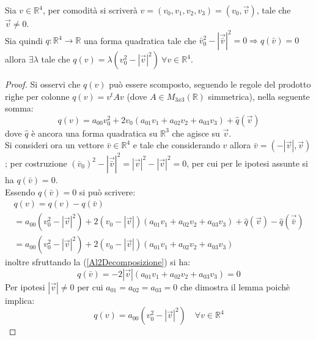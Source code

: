 \begin{lemma}
    Sia $v\in\mathbb{R}^4$, per comodità si scriverà $v=(v_0,v_1,v_2,v_3)=(v_0,\vec{v})$, tale che $\vec{v}\neq 0$.\\ Sia quindi $q:\mathbb{R}^4\rightarrow\mathbb{R}$ 
    una forma quadratica tale che $\bar{v}_0^2-|\vec{\bar{v}}|^2=0 \Rightarrow q(\bar{v})=0$ allora $\exists \lambda $ 
    tale che $ q(v)=\lambda(v_0^2-|\vec{v}|^2)\ \forall v\in\mathbb{R}^4$.
    \label{lemm:A2}
\end{lemma}
\begin{proof}
    Si osservi che $q(v)$ può essere scomposto, seguendo le regole del prodotto righe per colonne $q(v)=v^tAv$ (dove 
    $A\in M_{3x3}(\mathbb{R})$ simmetrica), nella seguente somma:
    \begin{equation*}
        q(v)=a_{00}v_0^2+2v_0(a_{01}v_1+a_{02}v_2+a_{03}v_3)+\hat{q}(\vec{v})
    \end{equation*}
    dove $\hat{q}$ è ancora una forma quadratica su $\mathbb{R}^3$ che agisce su $\vec{v}$.\\
    Si consideri ora un vettore $\bar{v}\in \mathbb{R}^4$ e tale che considerando $v$ allora $\bar{v}=(-|\vec{v}|,\vec{v})$; per costruzione
    $(\bar{v}_0)^2-|\vec{\bar{v}}|^2=|\vec{v}|^2-|\vec{v}|^2=0$, per cui per le ipotesi assunte si ha $q(\bar{v})=0$.\\
    Essendo $q(\bar{v})=0$ si può scrivere:
    \begin{equation}
        \begin{gathered}
            q(v)=q(v)-q(\bar{v})\\
            =a_{00}(v_0^2-|\vec{v}|^2)+2(v_0-|\vec{v}|)(a_{01}v_1+a_{02}v_2+a_{03}v_3)+\hat{q}(\vec{v})-\hat{q}(\vec{\bar{v}})\\
            =a_{00}(v_0^2-|\vec{v}|^2)+2(v_0-|\vec{v}|)(a_{01}v_1+a_{02}v_2+a_{03}v_3)
        \end{gathered}
       \label{Al2Decomposizione}
    \end{equation}
   inoltre sfruttando la (\ref{Al2Decomposizione}) si ha:
   \begin{equation*}
    q(\bar{v})=-2|\vec{v}|(a_{01}v_1+a_{02}v_2+a_{03}v_3)=0
   \end{equation*}
   Per ipotesi $|\vec{v}|\neq0$ per cui $a_{01}=a_{02}=a_{03}=0$ che dimostra il lemma poichè implica:
   \begin{equation}
    q(v)=a_{00}(v_0^2-|\vec{v}|^2)\quad \forall v\in\mathbb{R}^4
   \end{equation}
\end{proof}

